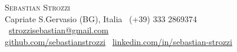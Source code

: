 \documentclass[10pt, a4paper]{article}
\begin{document}
		\thispagestyle{empty}
	
	\begin{center}
		{\fontsize{30pt}{36pt}\selectfont \scshape Sebastian Strozzi} \\ \vspace{3mm}
		Capriate S.Gervasio (BG), Italia \textbullet\ (+39) 333 2869374 \textbullet\  \href{mailto:strozzisebastian@gmail.com}{strozzisebastian@gmail.com}  \\ \vspace{2pt}
		\href{https://github.com/sebastianstrozzi}{github.com/sebastianstrozzi} \textbullet\ \href{https://www.linkedin.com/in/sebastian-strozzi}{linkedin.com/in/sebastian-strozzi}		   		
	\end{center}
	
	\vspace{2mm}
	
	
	
\end{document}
